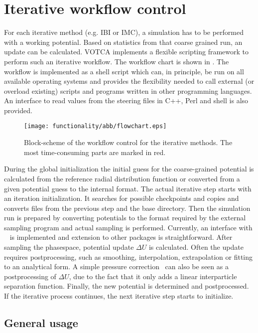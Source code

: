 \section{Iterative workflow control}
For each iterative method (e.g. IBI or IMC), a simulation has to be performed with a working potential. Based on statistics from that coarse grained run, an update can be calculated. VOTCA implements a flexible scripting framework to perform such an iterative workflow. The workflow chart is shown in . The workflow is implemented as a shell script which can, in principle, be run on all available operating systems and provides the flexibility needed to call external (or overload existing) scripts and programs written in other programming languages. An interface to read values from the steering \xml files in C++, Perl and shell is also provided.

\begin{figure}
  \texttt{[image: functionality/abb/flowchart.eps]}
  \caption{
    \label{fig:flowchart}
    Block-scheme of the workflow control for the iterative methods. The most time-consuming parts are marked in red.
  }
\end{figure}

During the global initialization the initial guess for the coarse-grained potential is calculated from the reference radial distribution function or converted from a given potential guess to the internal format. The actual iterative step starts with an iteration initialization. It searches for possible checkpoints and copies and converts files from the previous step and the base directory. Then the simulation run is prepared by converting potentials to the format required by the external sampling program and actual sampling is performed. Currently, an interface with \gromacs~\cite{gromacs4} is implemented and extension to other packages is straightforward. After sampling the phasespace, potential update $\Delta U$ is calculated. Often the update requires postprocessing, such as smoothing, interpolation, extrapolation or fitting to an analytical form. A simple pressure correction~\cite{Reith:2003} can also be seen as a postprocessing of $\Delta U$, due to the fact that it only adds a linear interparticle separation function.
%
Finally, the new potential is determined and postprocessed. If the iterative process continues, the next iterative step starts to initialize.

\subsection{General usage}

